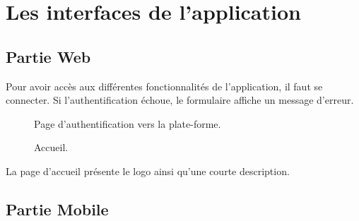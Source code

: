 \section{Les interfaces de l'application}
\subsection{Partie Web}
Pour avoir accès aux différentes fonctionnalités de l'application, il faut se connecter. Si l'authentification échoue, le formulaire affiche un message d'erreur. 
\begin{figure}[hbt!]
	\centering
	\caption{Page d'authentification vers la plate-forme.}
	\label{fig:1}
\end{figure}
\newline

\begin{figure}[hbt!]
	\centering
	\caption{Accueil.}
	\label{fig:1}
\end{figure}
La page d'accueil présente le logo ainsi qu'une courte description.
\clearpage

\subsection{Partie Mobile}

